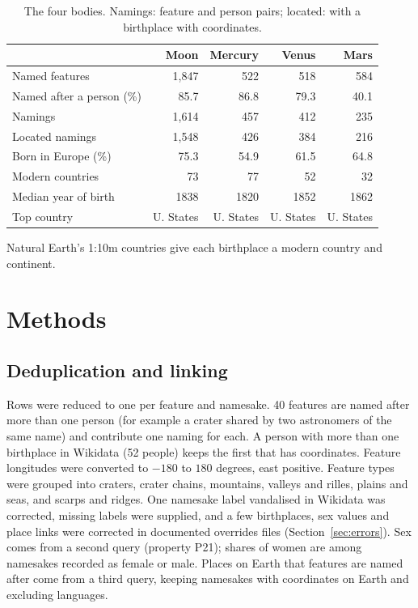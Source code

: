 \documentclass[11pt,a4paper]{article}
\begin{document}
\begin{table}[tbp]\centering\small\caption{The four bodies. Namings: feature and person pairs; located: with a birthplace with coordinates.}\label{tab:bodies}\begin{tabular}{lrrrr}\toprule & Moon & Mercury & Venus & Mars\\\midrule
Named features & 1,847 & 522 & 518 & 584\\
Named after a person (\%) & 85.7 & 86.8 & 79.3 & 40.1\\
Namings & 1,614 & 457 & 412 & 235\\
Located namings & 1,548 & 426 & 384 & 216\\
Born in Europe (\%) & 75.3 & 54.9 & 61.5 & 64.8\\
Modern countries & 73 & 77 & 52 & 32\\
Median year of birth & 1838 & 1820 & 1852 & 1862\\
Top country & U. States & U. States & U. States & U. States\\
\bottomrule\end{tabular}\end{table}

Natural Earth's 1:10m countries \citep{naturalearth} give each birthplace a modern country and continent.

\section{Methods}\label{sec:methods}
\subsection{Deduplication and linking}
Rows were reduced to one per feature and namesake. 40 features are named after more than one person (for example a crater shared by two astronomers of the same name) and contribute one naming for each. A person with more than one birthplace in Wikidata (52 people) keeps the first that has coordinates. Feature longitudes were converted to $-180$ to $180$ degrees, east positive. Feature types were grouped into craters, crater chains, mountains, valleys and rilles, plains and seas, and scarps and ridges. One namesake label vandalised in Wikidata was corrected, missing labels were supplied, and a few birthplaces, sex values and place links were corrected in documented overrides files (Section~\ref{sec:errors}). Sex comes from a second query (property P21); shares of women are among namesakes recorded as female or male. Places on Earth that features are named after come from a third query, keeping namesakes with coordinates on Earth and excluding languages.
\end{document}
